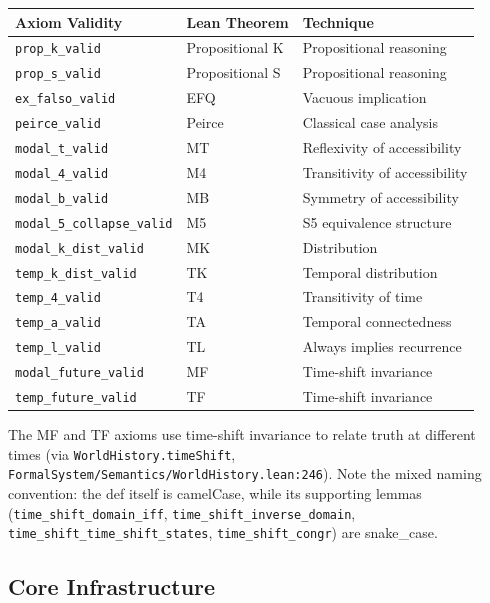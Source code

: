 \documentclass[../BimodalReference.tex]{subfiles}
\begin{document}
\begin{center}
\begin{tabular}{@{}lll@{}}
\toprule
Axiom Validity & Lean Theorem & Technique \\
\midrule
\texttt{prop\_k\_valid} & Propositional K & Propositional reasoning \\
\texttt{prop\_s\_valid} & Propositional S & Propositional reasoning \\
\texttt{ex\_falso\_valid} & EFQ & Vacuous implication \\
\texttt{peirce\_valid} & Peirce & Classical case analysis \\
\texttt{modal\_t\_valid} & MT & Reflexivity of accessibility \\
\texttt{modal\_4\_valid} & M4 & Transitivity of accessibility \\
\texttt{modal\_b\_valid} & MB & Symmetry of accessibility \\
\texttt{modal\_5\_collapse\_valid} & M5 & S5 equivalence structure \\
\texttt{modal\_k\_dist\_valid} & MK & Distribution \\
\texttt{temp\_k\_dist\_valid} & TK & Temporal distribution \\
\texttt{temp\_4\_valid} & T4 & Transitivity of time \\
\texttt{temp\_a\_valid} & TA & Temporal connectedness \\
\texttt{temp\_l\_valid} & TL & Always implies recurrence \\
\texttt{modal\_future\_valid} & MF & Time-shift invariance \\
\texttt{temp\_future\_valid} & TF & Time-shift invariance \\
\bottomrule
\end{tabular}
\end{center}

\noindent
The MF and TF axioms use time-shift invariance to relate truth at different times (via \texttt{WorldHistory.timeShift}, \texttt{FormalSystem/Semantics/WorldHistory.lean:246}). Note the mixed naming convention: the def itself is camelCase, while its supporting lemmas (\texttt{time\_shift\_domain\_iff}, \texttt{time\_shift\_inverse\_domain}, \texttt{time\_shift\_time\_shift\_states}, \texttt{time\_shift\_congr}) are snake\_case.

\subsection{Core Infrastructure}
\end{document}
